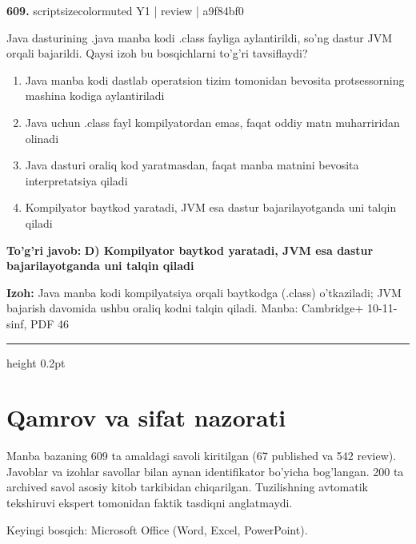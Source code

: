 \documentclass[10pt,a4paper]{article}
\begin{document}
{\bfseries\sffamily\color{ink} 609.} {scriptsizecolor{muted} Y1 | review | a9f84bf0}
\par
Java dasturining .java manba kodi .class fayliga aylantirildi, so'ng dastur JVM orqali bajarildi. Qaysi izoh bu bosqichlarni to'g'ri tavsiflaydi?
\begin{enumerate}[label=\Alph*),leftmargin=9mm]
\item Java manba kodi dastlab operatsion tizim tomonidan bevosita protsessorning mashina kodiga aylantiriladi
\item Java uchun .class fayl kompilyatordan emas, faqat oddiy matn muharriridan olinadi
\item Java dasturi oraliq kod yaratmasdan, faqat manba matnini bevosita interpretatsiya qiladi
\item Kompilyator baytkod yaratadi, JVM esa dastur bajarilayotganda uni talqin qiladi
\end{enumerate}
\begin{tcolorbox}[enhanced,breakable,colback=teal!4,colframe=teal!60!black,boxrule=0.45pt,arc=1.2mm,left=2.7mm,right=2.7mm,top=1.8mm,bottom=1.8mm,before skip=2mm,after skip=2mm]
{\bfseries\sffamily\color{teal}To'g'ri javob:} \textbf{D) Kompilyator baytkod yaratadi, JVM esa dastur bajarilayotganda uni talqin qiladi}
\par\smallskip
{\bfseries Izoh:} Java manba kodi kompilyatsiya orqali baytkodga (.class) o'tkaziladi; JVM bajarish davomida ushbu oraliq kodni talqin qiladi. Manba: Cambridge+ 10-11-sinf, PDF 46
\end{tcolorbox}
\vspace{2mm}\hrule height 0.2pt\vspace{3mm}
\clearpage\section*{Qamrov va sifat nazorati}
Manba bazaning 609 ta amaldagi savoli kiritilgan (67 published va 542 review).
Javoblar va izohlar savollar bilan aynan identifikator bo'yicha bog'langan.
200 ta archived savol asosiy kitob tarkibidan chiqarilgan.
Tuzilishning avtomatik tekshiruvi ekspert tomonidan faktik tasdiqni anglatmaydi.
\par Keyingi bosqich: Microsoft Office (Word, Excel, PowerPoint).
\end{document}
